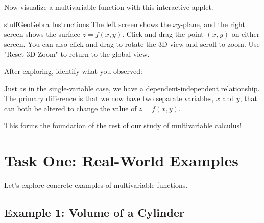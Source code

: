 \documentclass{ximera}
\begin{document}
\begin{problem}
Now visualize a multivariable function with this interactive applet.

\begin{expandable}{stuff}{GeoGebra Instructions}
    The left screen shows the $xy$-plane, and the right screen shows the surface $z = f(x,y)$. Click and drag the point $(x,y)$ on either screen. You can also click and drag to rotate the 3D view and scroll to zoom. Use "Reset 3D Zoom" to return to the global view.
\end{expandable}

\begin{center}
\end{center}

After exploring, identify what you observed:

\begin{selectAll}
\end{selectAll}

\begin{feedback}
Just as in the single-variable case, we have a dependent-independent relationship. The primary difference is that we now have two separate variables, $x$ and $y$, that can both be altered to change the value of $z = f(x,y)$.

This forms the foundation of the rest of our study of multivariable calculus!
\end{feedback}
\end{problem}

\section*{Task One: Real-World Examples}

Let's explore concrete examples of multivariable functions.

\subsection*{Example 1: Volume of a Cylinder}
\end{document}
